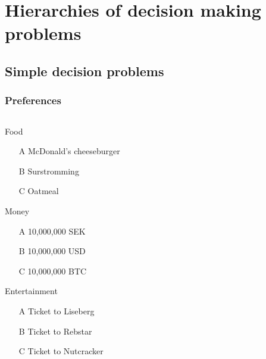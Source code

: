 \section{Hierarchies of decision making problems}
\begin{frame}
  \tableofcontents[currentsection]
\end{frame}
\subsection{Simple decision problems}
\begin{frame}
  \frametitle{Preferences}

  \begin{columns}
    \begin{column}{0.5\textwidth}
      \begin{block}{Food}
        \begin{itemize}
        \item[A] McDonald's cheeseburger
        \item[B] Surstromming
        \item[C] Oatmeal
        \end{itemize}
      \end{block}
      \begin{block}{Money}
        \begin{itemize}
        \item[A] 10,000,000 SEK
        \item[B] 10,000,000 USD
        \item[C] 10,000,000 BTC
        \end{itemize}
      \end{block}
      \begin{block}{Entertainment}
        \begin{itemize}
        \item[A] Ticket to Liseberg
        \item[B] Ticket to Rebstar
        \item[C] Ticket to Nutcracker
        \end{itemize}
      \end{block}
    \end{column}
    \begin{column}{0.5\textwidth}
    \end{column}
  \end{columns}
\end{frame}




